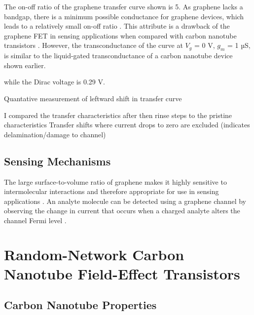 \documentclass[
  a4paper,
]{scrbook}
\begin{document}
The on-off ratio of the graphene transfer curve shown is 5. As graphene
lacks a bandgap, there is a minimum possible conductance for graphene
devices, which leads to a relatively small on-off ratio
\autocite{Novoselov2004,Geim2007}. This attribute is a drawback of the
graphene FET in sensing applications when compared with carbon nanotube
transistors \autocite{Novoselov2004}. However, the transconductance of
the curve at \(V_g\) = 0 V, \(g_m\) = 1 µS, is similar to the
liquid-gated transconductance of a carbon nanotube device shown earlier.

while the Dirac voltage is 0.29 V.

Quantative measurement of leftward shift in transfer curve

I compared the transfer characteristics after then rinse steps to the
pristine characteristics Transfer shifts where current drops to zero are
excluded (indicates delamination/damage to channel)

\hypertarget{sensing-mechanisms}{%
\subsection{Sensing Mechanisms}\label{sensing-mechanisms}}

The large surface-to-volume ratio of graphene makes it highly sensitive
to intermolecular interactions and therefore appropriate for use in
sensing applications \autocite{Ohno2015,Tran2016}. An analyte molecule
can be detected using a graphene channel by observing the change in
current that occurs when a charged analyte alters the channel Fermi
level \autocite{Heller2010,Ohno2015}.

\hypertarget{random-network-carbon-nanotube-field-effect-transistors}{%
\section{Random-Network Carbon Nanotube Field-Effect
Transistors}\label{random-network-carbon-nanotube-field-effect-transistors}}

\hypertarget{sec-carbon-nanotubes}{%
\subsection{Carbon Nanotube Properties}\label{sec-carbon-nanotubes}}
\end{document}
